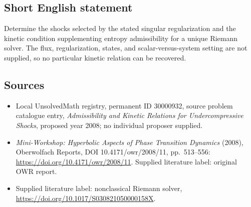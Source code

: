 \documentclass[11pt]{article}
\begin{document}
\subsection{Short English statement}
Determine the shocks selected by the stated singular regularization and the kinetic condition supplementing entropy admissibility for a unique Riemann solver. The flux, regularization, states, and scalar-versus-system setting are not supplied, so no particular kinetic relation can be recovered.
\subsection{Sources}
\begin{itemize}\item Local UnsolvedMath registry, permanent ID 30000932, source problem catalogue entry, \emph{Admissibility and Kinetic Relations for Undercompressive Shocks}, proposed year 2008; no individual proposer supplied.\item \emph{Mini-Workshop: Hyperbolic Aspects of Phase Transition Dynamics} (2008), Oberwolfach Reports, DOI 10.4171/owr/2008/11, pp.\ 513--556: \url{https://doi.org/10.4171/owr/2008/11}. Supplied literature label: original OWR report.\item Supplied literature label: nonclassical Riemann solver, \url{https://doi.org/10.1017/S030821050000158X}.\end{itemize}
\end{document}
